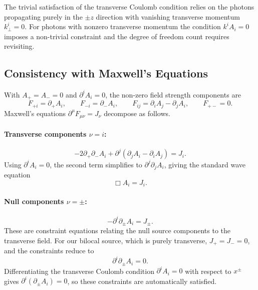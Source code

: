 The trivial satisfaction of the transverse Coulomb condition 
relies on the photons propagating purely in the $\pm z$ direction 
with vanishing transverse momentum $k^i_\perp = 0$. For photons 
with nonzero transverse momentum the condition $k^i A_i = 0$ 
imposes a non-trivial constraint and the degree of freedom count 
requires revisiting.

\subsection{Consistency with Maxwell's Equations}

With $A_+ = A_- = 0$ and $\partial^i A_i = 0$, the non-zero field strength 
components are
\begin{equation}
    F_{+i} = \partial_+ A_i, \qquad F_{-i} = \partial_- A_i, \qquad 
    F_{ij} = \partial_i A_j - \partial_j A_i, \qquad F_{+-} = 0.
\end{equation}
Maxwell's equations $\partial^\mu F_{\mu\nu} = J_\nu$ decompose as follows.

\paragraph{Transverse components $\nu = i$:}
\begin{equation}
    -2\partial_+\partial_- A_i + \partial^j(\partial_j A_i - \partial_i A_j) = J_i.
\end{equation}
Using $\partial^i A_i = 0$, the second term simplifies to $\partial^j\partial_j A_i$, 
giving the standard wave equation
\begin{equation}
    \boxed{\Box A_i = J_i.}
    \label{eq:wave}
\end{equation}

\paragraph{Null components $\nu = \pm$:}
\begin{equation}
    -\partial^i\partial_\pm A_i = J_\pm.
\end{equation}
These are constraint equations relating the null source components to the transverse 
field. For our bilocal source, which is purely transverse, $J_+ = J_- = 0$, and the 
constraints reduce to
\begin{equation}
    \partial^i\partial_\pm A_i = 0.
\end{equation}
Differentiating the transverse Coulomb condition $\partial^i A_i = 0$ with respect 
to $x^\pm$ gives $\partial^i(\partial_\pm A_i) = 0$, so these constraints are 
automatically satisfied. \checkmark

